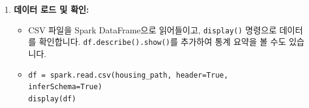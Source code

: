\documentclass[11pt,a4paper]{article}
\theoremstyle{definition}
\newcommand{\code}[1]{\texttt{#1}}
\begin{document}
\begin{enumerate}
\begin{itemize}
        \begin{lstlisting}[caption=데이터 경로 변수 설정 코드]
housing_path = "/Volumes/unity_catalog_demo/lab01/output/housing.csv"
        \end{lstlisting}
    \end{itemize}
    \item \textbf{데이터 로드 및 확인:}
    \begin{itemize}
        \item CSV 파일을 Spark DataFrame으로 읽어들이고, \code{display()} 명령으로 데이터를 확인합니다. \code{df.describe().show()}를 추가하여 통계 요약을 볼 수도 있습니다.
        \item 
        \begin{lstlisting}[caption=데이터 로드 및 확인 코드]
df = spark.read.csv(housing_path, header=True, inferSchema=True)
display(df)
        \end{lstlisting}
    \end{itemize}
\end{enumerate}
\end{document}
